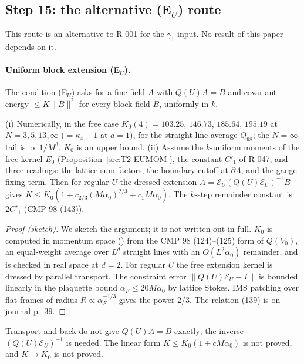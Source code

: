\subsection{Step 15: the alternative (E$_U$) route}\label{sec:src-EU}

This route is an alternative to R-001 for the $\gamma_1$ input. No result of this paper depends on it.

\paragraph{Uniform block extension (E$_U$).}
The condition (E$_U$) asks for a fine field $A$ with $Q(U)A=B$ and covariant energy $\le K\|B\|^2$ for every block field $B$, uniformly in $k$.

\begin{proposition}\label{src:EU}
(i) Numerically, in the free case $K_0(4)=103.25$, $146.73$, $185.64$, $195.19$ at $N=3,5,13,\infty$ ($=\kappa_4-1$ at $a=1$), for the straight-line average $Q_{98}$; the $N=\infty$ tail is $\propto1/M^3$. $K_0$ is an upper bound.
(ii) Assume the $k$-uniform moments of the free kernel $E_0$ (Proposition~\ref{src:T2-EUMOM}), the constant $C'_1$ of R-047, and three readings: the lattice-sum factors, the boundary cutoff at $\partial\Lambda$, and the gauge-fixing term. Then for regular $U$ the dressed extension $A=\mathcal E_U(Q(U)\mathcal E_U)^{-1}B$ gives $K\le K_0(1+c_{2/3}(M\alpha_0)^{2/3}+c_1M\alpha_0)$. The $k$-step remainder constant is $2C'_1$ (CMP 98 (143)).
\end{proposition}
\begin{proof}[Proof (sketch)]
We sketch the argument; it is not written out in full. $K_0$ is computed in momentum space () from the CMP 98 (124)--(125) form of $Q(V_0)$, an equal-weight average over $L^d$ straight lines with an $O(L^2\alpha_0)$ remainder, and is checked in real space at $d=2$. For regular $U$ the free extension kernel is dressed by parallel transport. The constraint error $\|Q(U)\mathcal E_U-I\|$ is bounded linearly in the plaquette bound $\alpha_F\le20M\alpha_0$ by lattice Stokes. IMS patching over flat frames of radius $R\propto\alpha_F^{-1/3}$ gives the power $2/3$. The relation (139) is on journal p.~39.
\end{proof}
Transport and back do not give $Q(U)A=B$ exactly; the inverse $(Q(U)\mathcal E_U)^{-1}$ is needed. The linear form $K\le K_0(1+cM\alpha_0)$ is not proved, and $K\to K_0$ is not proved.

